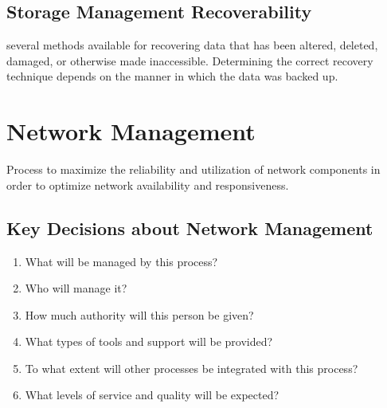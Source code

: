 \documentclass[a4]{article}
\newenvironment{Table}
   {\par\bigskip\noindent\minipage{\columnwidth}\centering}
   {\endminipage\par\bigskip}
\begin{document}
\begin{multicols}{3}
\begin{Table}
\end{Table}

\subsection{Storage Management Recoverability}
several methods available for recovering data that has been altered, deleted, damaged, or otherwise made inaccessible.
Determining the correct recovery technique depends on the manner in which the data was backed up.

\section{Network Management}
Process to maximize the reliability and utilization of network components in order to optimize network availability 
and responsiveness.


\subsection{Key Decisions about Network Management}
\begin{enumerate}
\item What will be managed by this process?
\item Who will manage it?
\item How much authority will this person be given?
\item What types of tools and support will be provided?
\item To what extent will other processes be integrated with this process?
\item What levels of service and quality will be expected?
\end{enumerate}


\end{multicols}
\end{document}

